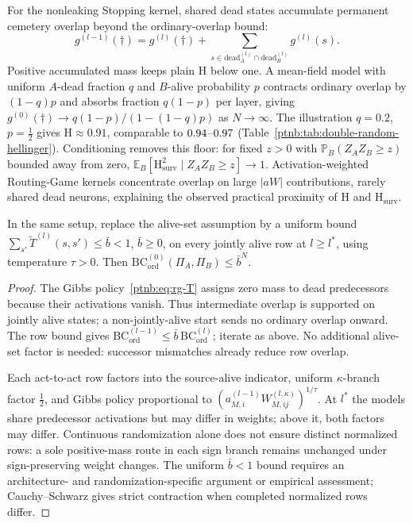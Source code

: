 \begin{remark}\label{ptnb:rem:adf-cemetery-floor}
For the nonleaking Stopping kernel, shared dead states accumulate permanent cemetery overlap beyond the ordinary-overlap bound:
\[
g^{(l-1)}(\dagger)=g^{(l)}(\dagger)+
\sum_{s\in\mathrm{dead}^{(l)}_A\cap\mathrm{dead}^{(l)}_B}g^{(l)}(s).
\]
Positive accumulated mass keeps plain $\mathrm H$ below one. A mean-field model with uniform
$A$-dead fraction $q$ and $B$-alive probability $p$ contracts ordinary overlap by $(1-q)p$
and absorbs fraction $q(1-p)$ per layer, giving
$g^{(0)}(\dagger)\to q(1-p)/(1-(1-q)p)$ as $N\to\infty$.
The illustration $q=0.2$, $p=\tfrac12$ gives $\mathrm H\approx0.91$, comparable to
$0.94$--$0.97$ (Table~\ref{ptnb:tab:double-random-hellinger}).
Conditioning removes this floor: for fixed $z>0$ with $\mathbb P_B(Z_AZ_B\ge z)$ bounded away
from zero, $\mathbb E_B[\mathrm H^2_{\mathrm{surv}}\mid Z_AZ_B\ge z]\to1$.
Activation-weighted Routing-Game kernels concentrate overlap on large $|aW|$ contributions,
rarely shared dead neurons, explaining the observed practical proximity of $\mathrm H$ and $\mathrm H_{\mathrm{surv}}$.
\end{remark}

\begin{theoremenv}\label{ptnb:thm:rand-routing}\label{thm:rand_routing}
In the same setup, replace the alive-set assumption by a uniform bound
$\sum_{s'}\widetilde T^{(l)}(s,s')\le\bar b<1$, $\bar b\ge0$, on every jointly alive row
at $l\ge l^*$, using temperature $\tau>0$. Then
$\mathrm{BC}^{(0)}_{\mathrm{ord}}(\Pi_A,\Pi_B)\le\bar b^N$.
\end{theoremenv}
\begin{proof}
The Gibbs policy~\eqref{ptnb:eq:rg-T} assigns zero mass to dead predecessors because their activations vanish.
Thus intermediate overlap is supported on jointly alive states; a non-jointly-alive start
sends no ordinary overlap onward. The row bound gives
$\mathrm{BC}^{(l-1)}_{\mathrm{ord}}\le\bar b\,\mathrm{BC}^{(l)}_{\mathrm{ord}}$;
iterate as above. No additional alive-set factor is needed: successor mismatches already reduce row overlap.

Each act-to-act row factors into the source-alive indicator, uniform $\kappa$-branch factor
$\tfrac12$, and Gibbs policy proportional to $(a^{(l-1)}_{M,i}W^{(l,\kappa)}_{M,ij})^{1/\tau}$.
At $l^*$ the models share predecessor activations but may differ in weights; above it, both
factors may differ. Continuous randomization alone does not ensure distinct normalized rows:
a sole positive-mass route in each sign branch remains unchanged under sign-preserving weight changes.
The uniform $\bar b<1$ bound requires an architecture- and randomization-specific argument or
empirical assessment; Cauchy--Schwarz gives strict contraction when completed normalized rows differ.
\end{proof}

